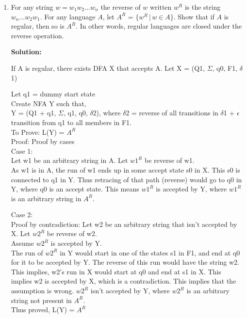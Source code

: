 \documentclass[11pt]{article}
\begin{document}
\begin{enumerate}[1.]
    
    \item For any string $w = w_1w_2...w_n$ the reverse of $w$ written $w^R$ is the string $w_n...w_2w_1$. For any language $A$, let $A^R$ = $\{w^R \,|\, w \in A\}$. Show that if $A$ is regular, then so is $A^R$. In other words, regular languages are closed under the reverse operation.
    
    \textbf{Solution:}
    
    If A is regular, there exists DFA X that accepts A.
    Let X = (Q1, $\Sigma$, q0, F1, $\delta$1)
    
    Let q1 = dummy start state\\
    Create NFA Y such that,\\
    
    Y = (Q1 + q1, $\Sigma$, q1, q0, $\delta$2), where $\delta$2 = reverse of all transitions in $\delta$1 + $\epsilon$ transition from q1 to all members in F1. \\
    
    To Prove: L(Y) = $A^R$\\
    Proof: Proof by cases\\
    
    Case 1:\\
    Let w1 be an arbitrary string in A. Let $w1^R$ be reverse of w1. \\
    As w1 is in A, the run of w1 ends up in some accept state s0 in X. This s0 is connected to q1 in Y. Thus retracing of that path (reverse) would go to q0 in Y, where q0 is an accept state. This means $w1^R$ is accepted by Y, where $w1^R$ is an arbitrary string in $A^R$. 
    
    Case 2:\\
    Proof by contradiction:
    Let w2 be an arbitrary string that isn't accepted by X. Let $w2^R$ be reverse of w2. \\
    
    Assume $w2^R$ is accepted by Y. \\
    The run of $w2^R$ in Y would start in one of the states s1 in F1, and end at q0 for it to be accepted by Y. The reverse of this run would have the string w2. This implies, w2's run in X would start at q0 and end at s1 in X. This implies w2 is accepted by X, which is a contradiction. This implies that the assumption is wrong. $w2^R$ isn't accepted by Y, where $w2^R$ is an arbitrary string not present in $A^R$. \\
    
    Thus proved, L(Y) = $A^R$\\
    

\end{enumerate}
\end{document}

